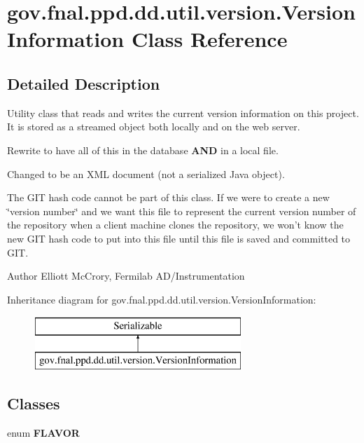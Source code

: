 \hypertarget{classgov_1_1fnal_1_1ppd_1_1dd_1_1util_1_1version_1_1VersionInformation}{\section{gov.\-fnal.\-ppd.\-dd.\-util.\-version.\-Version\-Information Class Reference}
\label{classgov_1_1fnal_1_1ppd_1_1dd_1_1util_1_1version_1_1VersionInformation}
}


\subsection{Detailed Description}
Utility class that reads and writes the current version information on this project. It is stored as a streamed object both locally and on the web server. 

Rewrite to have all of this in the database {\bfseries A\-N\-D} in a local file. 

Changed to be an X\-M\-L document (not a serialized Java object). 

The G\-I\-T hash code cannot be part of this class. If we were to create a new \char`\"{}version number\char`\"{} and we want this file to represent the current version number of the repository when a client machine clones the repository, we won't know the new G\-I\-T hash code to put into this file until this file is saved and committed to G\-I\-T. 

\begin{DoxyAuthor}{Author}
Elliott Mc\-Crory, Fermilab A\-D/\-Instrumentation 
\end{DoxyAuthor}
Inheritance diagram for gov.\-fnal.\-ppd.\-dd.\-util.\-version.\-Version\-Information\-:\begin{figure}[H]
\begin{center}
\leavevmode
\includegraphics[height=2.000000cm]{classgov_1_1fnal_1_1ppd_1_1dd_1_1util_1_1version_1_1VersionInformation}
\end{center}
\end{figure}
\subsection*{Classes}
\begin{DoxyCompactItemize}
\item 
enum {\bfseries F\-L\-A\-V\-O\-R}
\end{DoxyCompactItemize}
